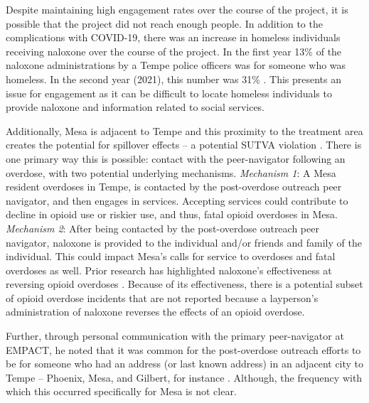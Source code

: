 Despite maintaining high engagement rates over the course of the project, it is possible that the project did not reach enough people. In addition to the complications with COVID-19, there was an increase in homeless individuals receiving naloxone over the course of the project. In the first year 13\% of the naloxone administrations by a Tempe police officers was for someone who was homeless. In the second year (2021), this number was 31\% \parencite{watts_tempe_2023}. This presents an issue for engagement as it can be difficult to locate homeless individuals to provide naloxone and information related to social services.

Additionally, Mesa is adjacent to Tempe and this proximity to the treatment area creates the potential for spillover effects -- a potential SUTVA violation \parencite{rubin_formal_1990}. There is one primary way this is possible: contact with the peer-navigator following an overdose, with two potential underlying mechanisms. \textit{Mechanism 1}: A Mesa resident overdoses in Tempe, is contacted by the post-overdose outreach peer navigator, and then engages in services. Accepting services could contribute to decline in opioid use or riskier use, and thus, fatal opioid overdoses in Mesa. \textit{Mechanism 2}: After being contacted by the post-overdose outreach peer navigator, naloxone is provided to the individual and/or friends and family of the individual. This could impact Mesa's calls for service to overdoses and fatal overdoses as well. Prior research has highlighted naloxone's effectiveness at reversing opioid overdoses \parencite{giglio_effectiveness_2015}. Because of its effectiveness, there is a potential subset of opioid overdose incidents that are not reported because a layperson's administration of naloxone reverses the effects of an opioid overdose. 

Further, through personal communication with the primary peer-navigator at EMPACT, he noted that it was common for the post-overdose outreach efforts to be for someone who had an address (or last known address) in an adjacent city to Tempe -- Phoenix, Mesa, and Gilbert, for instance \parencite{watts_personal_2024}. Although, the frequency with which this occurred specifically for Mesa is not clear.

